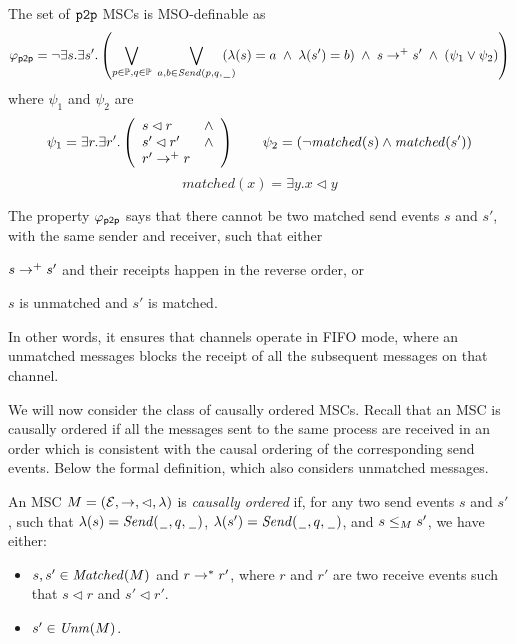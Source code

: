 The set of $\mathtt{p2p}$ MSCs is MSO-definable as
	\[
		\varphi_{\mathsf{p2p}} = \neg \exists s.\exists s'. \left(
		\bigvee_{\substack{p \in \mathbb{P}, q \in \mathbb{P}}}\;
		\bigvee_{\substack{a,b \in {\mathit{Send}(p,q,\hspace{0.1em}\underline{\hspace{0.5em}}\hspace{0.1em})}}}\hspace{-1em}
		(\lambda(s) = a \;\wedge\; \lambda(s') = b) \;\wedge\; s \to^+ s' \;\wedge\;
		(\psi_1 \vee \psi_2 ) 	
		\right)
	\]
	where $\psi_1$ and $\psi_2$ are
	\[
		\psi_1 = \exists r.\exists r'.\left(
		\begin{array}{ll}
			s \lhd r & \wedge\\
			s' \lhd r' & \wedge\\
			r' \to^+ r &
		\end{array} 
		\right) \quad \quad
		\psi_2 = (\neg \mathit{matched}(s) \wedge \mathit{matched}(s'))
		\]
		\[
		matched(x) = \exists y. x \lhd y
	\]

The property $\varphi_{\mathsf{p2p}}$ says that there cannot be two matched send events $s$ and $s'$, with the same sender and receiver, such that either
\begin{enumerate*}[label={(\roman*)}]
	\item $s \to^+ s'$ and their receipts happen in the reverse order, or
	\item $s$ is unmatched and $s'$ is matched.
\end{enumerate*}
In other words, it ensures that channels operate in FIFO mode, where an unmatched messages blocks the receipt of all the subsequent messages on that channel.




We will now consider the class of causally ordered MSCs. Recall that an MSC is causally ordered if all the messages sent to the same process are received in an order which is consistent with the causal ordering of the corresponding send events. Below the formal definition, which also considers unmatched messages.

\begin{definition}
An MSC $M = (\mathcal{E},\to,\lhd,\lambda)$ is \emph{causally ordered} if, for any two send events $s$ and $s'$, such that $\lambda(s)={\mathit{Send}(\hspace{0.1em}\underline{\hspace{0.5em}}\hspace{0.1em},q,\hspace{0.1em}\underline{\hspace{0.5em}}\hspace{0.1em})}$, $\lambda(s')={\mathit{Send}(\hspace{0.1em}\underline{\hspace{0.5em}}\hspace{0.1em},q,\hspace{0.1em}\underline{\hspace{0.5em}}\hspace{0.1em})}$, and $s \le_M s'$, we have either:
\begin{itemize}\itemsep=0.5ex
	\item $s,s' \in \mathit{Matched}(M)$ and $r \to^* r'$, where $r$ and $r'$ are two receive events such that $s \lhd r$ and $s' \lhd r'$.
	\item $s' \in \mathit{Unm}(M)$.
\end{itemize}
\end{definition}


